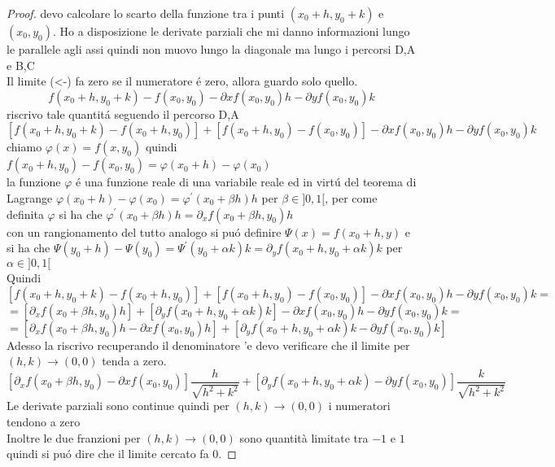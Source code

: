 \begin{proof}
	devo calcolare lo scarto della funzione tra i punti $(x_0+h,y_0+k)$ e $(x_0,y_0)$. Ho a disposizione le derivate parziali che mi danno informazioni lungo le parallele agli assi quindi non muovo lungo la diagonale ma lungo i percorsi D,A e B,C\\
	Il limite  (<-) fa zero se il numeratore \'e zero, allora guardo solo quello.\\
	$$f(x_0+h,y_0+k) -f(x_0,y_0)- \partial{x}f(x_0,y_0)h - \partial{y}f(x_0,y_0)k$$
	riscrivo tale quantit\'a seguendo il percorso D,A
	$$ [f(x_0+h,y_0+k) - f(x_0+h,y_0)] + [f(x_0+h,y_0) - f(x_0,y_0)] - \partial{x}f(x_0,y_0)h - \partial{y}f(x_0,y_0)k$$
	chiamo $\varphi (x) = f(x,y_0)$ quindi $f(x_0+h,y_0)-f(x_0,y_0) = \varphi (x_0+h)-\varphi (x_0)$\\
	la funzione $\varphi $ \'e una funzione reale di una variabile reale ed in virt\'u del teorema di Lagrange $\varphi (x_0+h)-\varphi (x_0) = \varphi^{'}(x_0 + \beta h)h$ per $\beta\in ]0,1[ $, per come definita $\varphi$ si ha che $\varphi^{'}(x_0 + \beta h)h = \partial_{x}f(x_0+\beta h,y_0)h$\\
	con un rangionamento del tutto analogo si pu\'o definire $\varPsi (x) = f(x_0+h,y)$ e si ha che $\varPsi (y_0+h)-\varPsi (y_0) = \varPsi^{'}(y_0 + \alpha k)k = \partial_{y}f(x_0+h,y_0+\alpha k)k$ per $\alpha\in ]0,1[ $\\
	Quindi
	$$ [f(x_0+h,y_0+k) - f(x_0+h,y_0)] + [f(x_0+h,y_0) - f(x_0,y_0)] - \partial{x}f(x_0,y_0)h - \partial{y}f(x_0,y_0)k = $$
	$$= [\partial_{x}f(x_0+\beta h,y_0)h] + [\partial_{y}f(x_0+h,y_0+\alpha k)k] - \partial{x}f(x_0,y_0)h - \partial{y}f(x_0,y_0)k = $$
	$$= [\partial_{x}f(x_0+\beta h,y_0)h - \partial{x}f(x_0,y_0)h] + [\partial_{y}f(x_0+h,y_0+\alpha k)k  - \partial{y}f(x_0,y_0)k] $$
	Adesso la riscrivo recuperando il denominatore 	'e devo verificare che il limite per $(h,k)\rightarrow (0,0)$ tenda a zero.\\
	
	$$[\partial_{x}f(x_0+\beta h,y_0)-\partial{x}f(x_0,y_0)] \frac{h}{\sqrt{h^2+k^2}} + [\partial_{y}f(x_0+h,y_0+\alpha k) - \partial{y}f(x_0,y_0)]\frac{k}{\sqrt{h^2+k^2}} $$
	Le derivate parziali sono continue quindi per $(h,k)\rightarrow (0,0)$ i numeratori tendono a zero\\
	Inoltre le due franzioni per $(h,k)\rightarrow (0,0)$ sono quantità limitate tra $-1$ e $1$ quindi si pu\'o dire che il limite cercato fa 0.
\end{proof}


